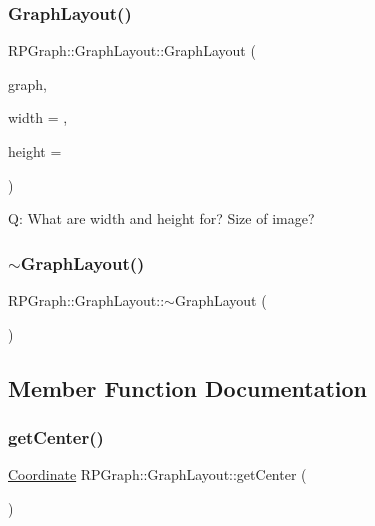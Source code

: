 \subsubsection{\texorpdfstring{Graph\+Layout()}{GraphLayout()}}
{\footnotesize\ttfamily R\+P\+Graph\+::\+Graph\+Layout\+::\+Graph\+Layout (\begin{DoxyParamCaption}\item[{\mbox{\hyperlink{classRPGraph_1_1UGraph}{R\+P\+Graph\+::\+U\+Graph}} \&}]{graph,  }\item[{float}]{width = {},  }\item[{float}]{height = {} }\end{DoxyParamCaption})}

Q\+: What are width and height for? Size of image? \mbox{\label{classRPGraph_1_1GraphLayout_a284707481e0ba81f1dec33a03bc1293c}} 
\subsubsection{\texorpdfstring{$\sim$\+Graph\+Layout()}{~GraphLayout()}}
{\footnotesize\ttfamily R\+P\+Graph\+::\+Graph\+Layout\+::$\sim$\+Graph\+Layout (\begin{DoxyParamCaption}{ }\end{DoxyParamCaption})}



\subsection{Member Function Documentation}
\mbox{\label{classRPGraph_1_1GraphLayout_aa9a3cfeb1f895fce3c9b352200251d5f}} 
\subsubsection{\texorpdfstring{get\+Center()}{getCenter()}}
{\footnotesize\ttfamily \mbox{\hyperlink{classRPGraph_1_1Coordinate}{Coordinate}} R\+P\+Graph\+::\+Graph\+Layout\+::get\+Center (\begin{DoxyParamCaption}{ }\end{DoxyParamCaption})}

